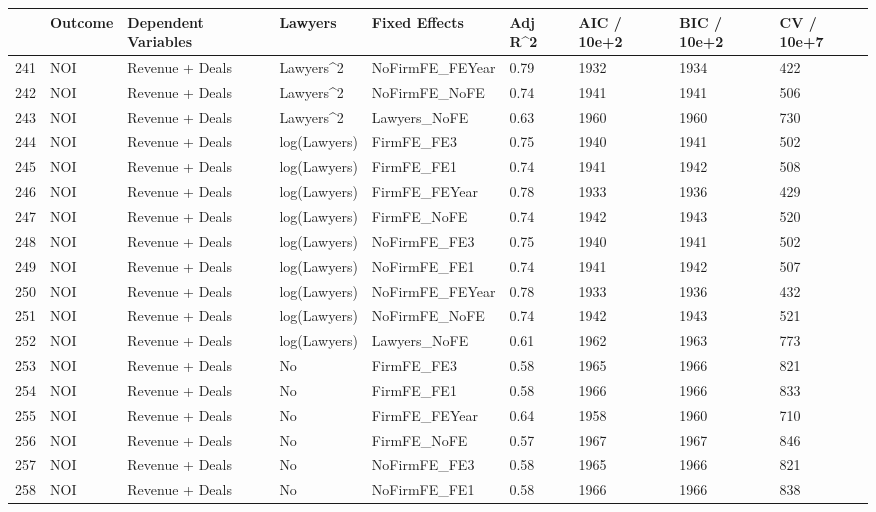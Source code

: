 \documentclass{article}
\begin{document}
\begin{table}[H]
\centering
\begin{tabular}{rllllllll}
  \hline
 & Outcome & Dependent Variables & Lawyers & Fixed Effects & Adj R^2 & AIC / 10e+2 & BIC / 10e+2 & CV / 10e+7 \\ 
  \hline
241 & NOI & Revenue + Deals & Lawyers^2 & NoFirmFE\_FEYear & 0.79 & 1932 & 1934 & 422 \\ 
  242 & NOI & Revenue + Deals & Lawyers^2 & NoFirmFE\_NoFE & 0.74 & 1941 & 1941 & 506 \\ 
  243 & NOI & Revenue + Deals & Lawyers^2 & Lawyers\_NoFE & 0.63 & 1960 & 1960 & 730 \\ 
  244 & NOI & Revenue + Deals & log(Lawyers) & FirmFE\_FE3 & 0.75 & 1940 & 1941 & 502 \\ 
  245 & NOI & Revenue + Deals & log(Lawyers) & FirmFE\_FE1 & 0.74 & 1941 & 1942 & 508 \\ 
  246 & NOI & Revenue + Deals & log(Lawyers) & FirmFE\_FEYear & 0.78 & 1933 & 1936 & 429 \\ 
  247 & NOI & Revenue + Deals & log(Lawyers) & FirmFE\_NoFE & 0.74 & 1942 & 1943 & 520 \\ 
  248 & NOI & Revenue + Deals & log(Lawyers) & NoFirmFE\_FE3 & 0.75 & 1940 & 1941 & 502 \\ 
  249 & NOI & Revenue + Deals & log(Lawyers) & NoFirmFE\_FE1 & 0.74 & 1941 & 1942 & 507 \\ 
  250 & NOI & Revenue + Deals & log(Lawyers) & NoFirmFE\_FEYear & 0.78 & 1933 & 1936 & 432 \\ 
  251 & NOI & Revenue + Deals & log(Lawyers) & NoFirmFE\_NoFE & 0.74 & 1942 & 1943 & 521 \\ 
  252 & NOI & Revenue + Deals & log(Lawyers) & Lawyers\_NoFE & 0.61 & 1962 & 1963 & 773 \\ 
  253 & NOI & Revenue + Deals & No & FirmFE\_FE3 & 0.58 & 1965 & 1966 & 821 \\ 
  254 & NOI & Revenue + Deals & No & FirmFE\_FE1 & 0.58 & 1966 & 1966 & 833 \\ 
  255 & NOI & Revenue + Deals & No & FirmFE\_FEYear & 0.64 & 1958 & 1960 & 710 \\ 
  256 & NOI & Revenue + Deals & No & FirmFE\_NoFE & 0.57 & 1967 & 1967 & 846 \\ 
  257 & NOI & Revenue + Deals & No & NoFirmFE\_FE3 & 0.58 & 1965 & 1966 & 821 \\ 
  258 & NOI & Revenue + Deals & No & NoFirmFE\_FE1 & 0.58 & 1966 & 1966 & 838 \\ 

\end{tabular}
\end{table}
\end{document}
